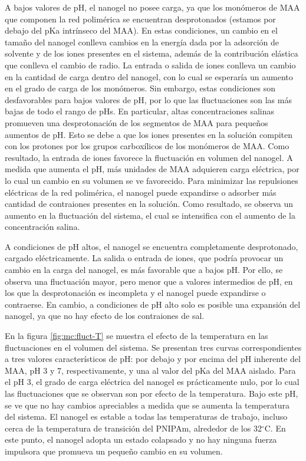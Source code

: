 	A bajos valores de pH, el nanogel no posee carga, ya que los mon\'omeros de MAA que componen la red polim\'erica se encuentran desprotonados (estamos por debajo del pKa intr\'inseco del MAA). En estas condiciones, un cambio en el tama\~no del nanogel conlleva cambios en la energ\'ia dada por la adsorci\'on de solvente y de los iones presentes en el sistema, adem\'as de la contribuci\'on el\'astica que conlleva el cambio de radio.
	La entrada o salida de iones conlleva un cambio en la cantidad de carga dentro del nanogel, con lo cual se esperar\'ia un aumento en el grado de carga de los mon\'omeros. Sin embargo, estas condiciones son desfavorables para bajos valores de pH, por lo que las fluctuaciones son las m\'as bajas de todo el rango de pHs.
	En particular, altas concentraciones salinas promueven una desprotonaci\'on de los segmentos de MAA para peque\~nos aumentos de pH. Esto se debe a que los iones presentes en la soluci\'on compiten con los protones por los grupos carbox\'ilicos de los mon\'omeros de MAA. Como resultado, la entrada de iones favorece la fluctuaci\'on en volumen del nanogel.
	A medida que aumenta el pH, m\'as unidades de MAA adquieren carga el\'ectrica, por lo cual un cambio en su volumen se ve favorecido. Para minimizar las repulsiones el\'ectricas de la red polim\'erica, el nanogel puede expandirse o adsorber m\'as cantidad de contraiones presentes en la soluci\'on. Como resultado, se observa un aumento en la fluctuaci\'on del sistema, el cual se intensifica con el aumento de la concentraci\'on salina.
	
	A condiciones de pH altos, el nanogel se encuentra completamente desprotonado, cargado el\'ectricamente. La salida o entrada de iones, que podr\'ia provocar un cambio en la carga del nanogel, es m\'as favorable que a bajos pH. Por ello, se observa una fluctuaci\'on mayor, pero menor que a valores intermedios de pH, en los que la desprotonaci\'on es incompleta y el nanogel puede expandirse o contraerse. En cambio, a condiciones de pH alto solo es posible una expansi\'on del nanogel, ya que no hay efecto de los contraiones de sal.
	
	
	
	
	En la figura \ref{fig:mc:fluct-T} se muestra el efecto de la temperatura en las fluctuaciones en el volumen del sistema. Se presentan tres curvas correspondientes a tres valores caracter\'isticos de pH: por debajo y por encima del pH inherente del MAA, pH 3 y 7, respectivamente, y una al valor del pKa del MAA aislado.
	Para el pH 3, el grado de carga el\'ectrica del nanogel es pr\'acticamente nulo, por lo cual las fluctuaciones que se observan son por efecto de la temperatura. Bajo este pH, se ve que no hay cambios apreciables a medida que se aumenta la temperatura del sistema. El nanogel es estable a todas las temperaturas de trabajo, incluso cerca de la temperatura de transici\'on del PNIPAm, alrededor de los 32$^\circ$C. En este punto, el nanogel adopta un estado colapsado y no hay ninguna fuerza impulsora que promueva un peque\~no cambio en su volumen.
	
